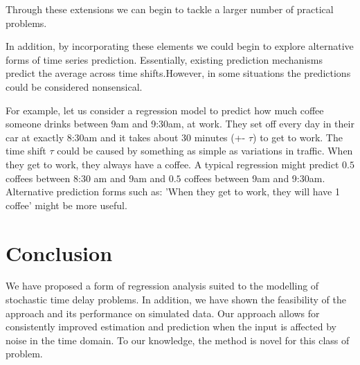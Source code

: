 \documentclass[11pt]{amsart}
\begin{document}
Through these extensions we can begin to tackle a larger number of practical problems.

In addition, by incorporating these elements we could begin to explore alternative forms of time series prediction. Essentially, existing prediction mechanisms predict the average across time shifts.However, in some situations the predictions could be considered nonsensical.

For example, let us consider a regression model to predict how much coffee someone drinks between 9am and 9:30am, at work. They set off every day in their car at exactly 8:30am and it takes about 30 minutes (+- $\tau$) to get to work. The time shift $\tau$ could be caused by something as simple as variations in traffic. When they get to work, they always have a coffee. A typical regression might predict $0.5$ coffees between 8:30 am and 9am and $0.5$ coffees between 9am and 9:30am. Alternative prediction forms such as: 'When they get to work, they will have 1 coffee' might be more useful.


\section{Conclusion}

We have proposed a form of regression analysis suited to the modelling of stochastic time delay problems. In addition, we have shown the feasibility of the approach and its performance on simulated data. Our approach allows for consistently improved estimation and prediction when the input is affected by noise in the time domain. To our knowledge, the method is novel for this class of problem.
\end{document}
